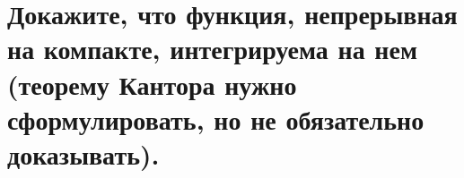 \section{Докажите, что функция, непрерывная на компакте, интегрируема на нем (теорему Кантора нужно сформулировать, но не обязательно доказывать).}